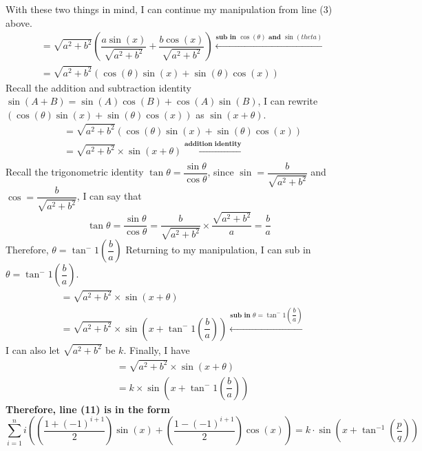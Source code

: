 \documentclass[12pt]{book}
\begin{document}
\begin{enumerate}
With these two things in mind, I can continue my manipulation from line (3) above.
\begin{align}
    &= \sqrt{a^2 + b^2}\left(\dfrac{a\sin(x)}{\sqrt{a^2 + b^2}} + \dfrac{b\cos(x)}{\sqrt{a^2 + b^2}} \right) \xleftarrow[]{\textbf{sub in $\cos(\theta)$ and $\sin(theta)$}} \\
    &= \sqrt{a^2 + b^2}\left(\cos(\theta)\sin(x) + \sin(\theta)\cos(x) \right)
\end{align}
Recall the addition and subtraction identity $\sin(A+B) = \sin(A)\cos(B) + \cos(A)\sin(B)$, I can rewrite $(\cos(\theta)\sin(x) + \sin(\theta)\cos(x))$ as $\sin(x + \theta)$.
\begin{align}
    &= \sqrt{a^2 + b^2}\left(\cos(\theta)\sin(x) + \sin(\theta)\cos(x) \right)\\
    &= \sqrt{a^2 + b^2} \times \sin(x+\theta) \xleftarrow[]{\textbf{addition identity}}
\end{align}
Recall the trigonometric identity $\tan \theta = \dfrac{\sin \theta}{\cos \theta}$, since $\sin = \dfrac{b}{\sqrt{a^2+b^2}}$ and $\cos = \dfrac{b}{\sqrt{a^2+b^2}}$, I can say that
$$\tan\theta = \dfrac{\sin\theta}{\cos\theta} = \dfrac{b}{\sqrt{a^2+b^2}} \times \dfrac{\sqrt{a^2+b^2}}{a} = \dfrac{b}{a}$$
Therefore, $\theta = \tan^-1\left(\dfrac{b}{a}\right)$
Returning to my manipulation, I can sub in $\theta = \tan^-1\left(\dfrac{b}{a}\right)$.
\begin{align}
    &= \sqrt{a^2 + b^2} \times \sin(x+\theta)\\
    &= \sqrt{a^2 + b^2} \times \sin(x+\tan^-1\left(\dfrac{b}{a}\right)) \xleftarrow[]{\textbf{sub in $\theta = \tan^-1\left(\dfrac{b}{a}\right)$}}
\end{align}
I can also let $\sqrt{a^2 + b^2}$ be $k$. Finally, I have
\begin{align}
    &= \sqrt{a^2 + b^2} \times \sin(x+\theta)\\
    &= k \times \sin \left(x+\tan^-1\left(\dfrac{b}{a}\right)\right)
\end{align}
\textbf{Therefore, line (11) is in the form $$\sum\limits_{i=1}^{n} i\left(\left(\dfrac{1+(-1)^{i+1}}{2}\right)\sin(x) + \left(\dfrac{1-(-1)^{i+1}}{2}\right)\cos(x)\right) = k \cdot \sin\left(x+\tan^{-1}\left(\frac{p}{q}\right)\right)$$}


\end{enumerate}
\end{document}
